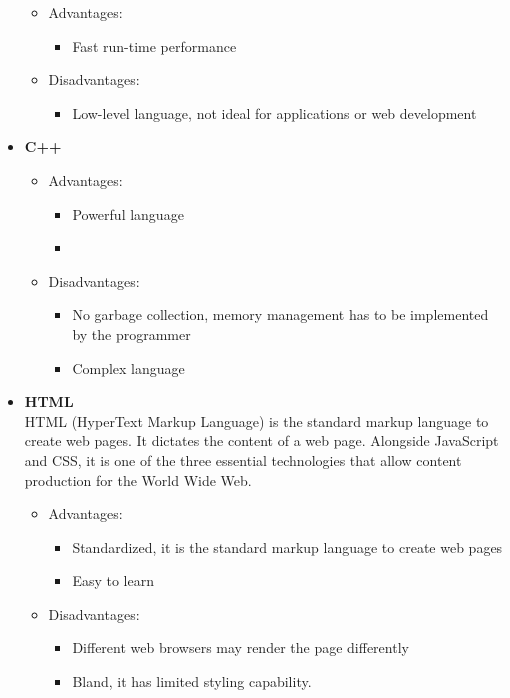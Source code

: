 \documentclass{article}
\begin{document}
\begin{itemize}
				\begin{itemize}
					\item Advantages:
						\begin{itemize}
							\item Fast run-time performance
						\end{itemize}
						
					\item Disadvantages:
						\begin{itemize}
							\item Low-level language, not ideal for applications or web development
						\end{itemize}
				\end{itemize}
				
			\item\textbf{C++} \\
			
				\begin{itemize}
					\item Advantages:
						\begin{itemize}
							\item Powerful language
							\item 
						\end{itemize}
						
					\item Disadvantages:
						\begin{itemize}
							\item No garbage collection, memory management has to be implemented by the programmer
							\item Complex language
						\end{itemize}
				\end{itemize}
				
			\item\textbf{HTML} \\ %
			HTML (HyperText Markup Language) is the standard markup language to create web pages. It dictates the content of a web page. Alongside JavaScript and CSS, it is one of the three essential technologies that allow content production for the World Wide Web.
				\begin{itemize}
					\item Advantages:
						\begin{itemize}
							\item Standardized, it is the standard markup language to create web pages
							\item Easy to learn
						\end{itemize}
					\item Disadvantages:
						\begin{itemize}
							\item Different web browsers may render the page differently
							\item Bland, it has limited styling capability.
						\end{itemize}
				\end{itemize}

		\end{itemize}
\end{document}
